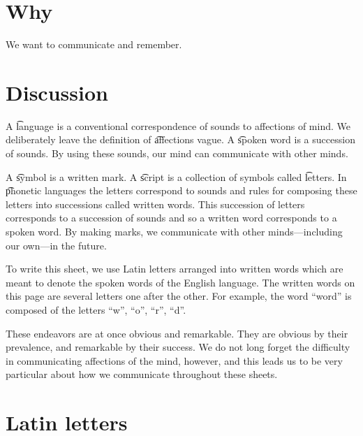 
\section*{Why}

We want to communicate and remember.

\section*{Discussion}

A \t{language} is a conventional correspondence of sounds to affections of mind.
We deliberately leave the definition of \t{affections} vague.
A \t{spoken word} is a succession of sounds.
By using these sounds, our mind can communicate with other minds.

A \t{symbol} is a written mark.
A \t{script} is a collection of symbols called \t{letters}.
In \t{phonetic} languages the letters correspond to sounds and rules for composing these letters into successions called written words.
This succession of letters corresponds to a succession of sounds and so a written word corresponds to a spoken word.
By making marks, we communicate with other minds---including our own---in the future.

To write this sheet, we use Latin letters arranged into written words which are meant to denote the spoken words of the English language.
The written words on this page are several letters one after the other.
For example, the word ``word'' is composed of the letters ``w'', ``o'', ``r'', ``d''.

These endeavors are at once obvious and remarkable.
They are obvious by their prevalence, and remarkable by their success.
We do not long forget the difficulty in communicating affections of the mind, however, and this leads us to be very particular about how we communicate throughout these sheets.

\section*{Latin letters}

